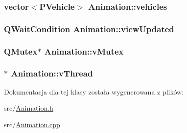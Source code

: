 \hypertarget{class_animation_af4fc6cb04c14b73cd645e72f07e07b79}{
\subsubsection[{vehicles}]{\setlength{\rightskip}{0pt plus 5cm}vector$<${\bf P\-Vehicle}$>$ Animation\-::vehicles\hspace{0.3cm}{\ttfamily [private]}}}\label{class_animation_af4fc6cb04c14b73cd645e72f07e07b79}
\hypertarget{class_animation_a0de54bc2a828ee856a1e4b36b4952a3c}{
\subsubsection[{view\-Updated}]{\setlength{\rightskip}{0pt plus 5cm}Q\-Wait\-Condition Animation\-::view\-Updated\hspace{0.3cm}{\ttfamily [private]}}}\label{class_animation_a0de54bc2a828ee856a1e4b36b4952a3c}
\hypertarget{class_animation_aed6db8ae1ae26cb18467ca84be657b2d}{
\subsubsection[{v\-Mutex}]{\setlength{\rightskip}{0pt plus 5cm}Q\-Mutex$\ast$ Animation\-::v\-Mutex\hspace{0.3cm}{\ttfamily [private]}}}\label{class_animation_aed6db8ae1ae26cb18467ca84be657b2d}
\hypertarget{class_animation_ae5c845cf54f1bf8d1bc1eeb687ea9afa}{
\subsubsection[{v\-Thread}]{$\ast$ Animation\-::v\-Thread\hspace{0.3cm}{\ttfamily [private]}}}\label{class_animation_ae5c845cf54f1bf8d1bc1eeb687ea9afa}


Dokumentacja dla tej klasy została wygenerowana z plików\-:\begin{DoxyCompactItemize}
\item 
src/\hyperlink{_animation_8h}{Animation.\-h}\item 
src/\hyperlink{_animation_8cpp}{Animation.\-cpp}\end{DoxyCompactItemize}
